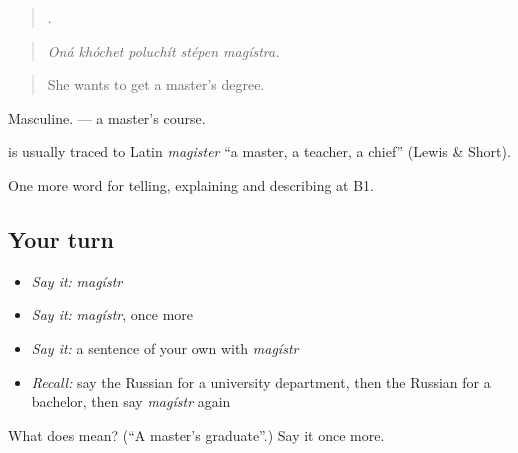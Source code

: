 \begin{quote}
    .
\end{quote}

\begin{quote}
\emph{Oná khóchet poluchít stépen magístra.}
\end{quote}

\begin{quote}
She wants to get a master’s degree.
\end{quote}

Masculine. \emph{} — a master’s course.

\begin{cousinweb}
\textbf{} is usually traced to Latin \emph{magister} \textquotedblleft{}a master, a teacher, a chief\textquotedblright{} (Lewis \& Short).
\end{cousinweb}

\begin{grammarlens}[title={What you've built}]
One more word for telling, explaining and describing at B1.
\end{grammarlens}

\subsection*{Your turn}
\begin{itemize}
\raggedright
  \item \emph{Say it:} \emph{magístr}
  \item \emph{Say it:} \emph{magístr}, once more
  \item \emph{Say it:} a sentence of your own with \emph{magístr}
  \item \emph{Recall:} say the Russian for a university department, then the Russian for a bachelor, then say \emph{magístr} again
\end{itemize}

\begin{tcolorbox}[breakable,colback=teal!4,colframe=teal!35!black,title={Before you move on}]
What does  mean? (\textquotedblleft{}A master’s graduate\textquotedblright{}.) Say it once more.
\end{tcolorbox}
